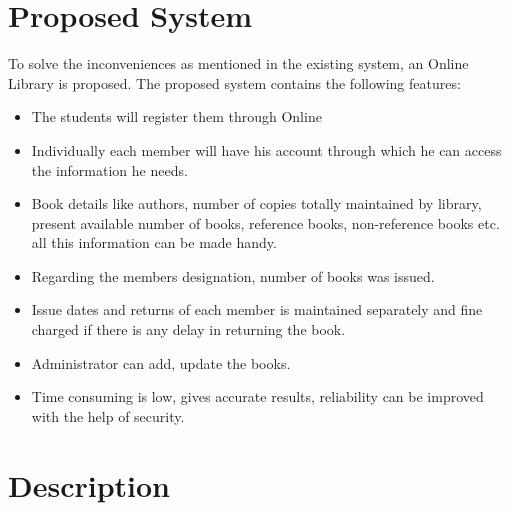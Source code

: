 \documentclass[12pt, a4paper]{report}
\begin{document}
\section{Proposed System}

To solve the inconveniences as mentioned in the existing system, an Online Library is
proposed. The proposed system contains the following features:
\begin{itemize}
	\item The students will register them through Online
	\item Individually each member will have his account through which he can access the
	information he needs.
	\item Book details like authors, number of copies totally maintained by library, present
	available number of books, reference books, non-reference books etc. all this
	information can be made handy.
	\item Regarding the members designation, number of books was issued.
	\item Issue dates and returns of each member is maintained separately and fine charged
	if there is any delay in returning the book.
	\item Administrator can add, update the books.
	\item Time consuming is low, gives accurate results, reliability can be improved with
	the help of security.
\end{itemize}


\section{Description}
\end{document}
